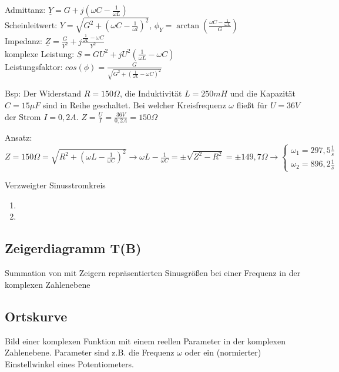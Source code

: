 \documentclass[german]{article}
\newcommand{\ohm}{\Omega}
\begin{document}
\begin{enumerate}
		Admittanz: $\underline{Y} = G + j\left( \omega C - \frac1{\omega L} \right)$ \\
		Scheinleitwert: $Y = \sqrt{G^2 + \left( \omega C - \frac1{\omega l} \right)^2}$, $\phi_Y = \arctan\left( \frac{\omega C - \frac1{\omega L}}{G} \right)$ \\
		Impedanz: $\underline{Z} = \frac{G}{Y^2} + j \frac{\frac1{\omega L} - \omega C}{Y^2}$ \\
		komplexe Leistung: $\underline{S} = GU^2 + j U^2 \left( \frac1{\omega L} - \omega C \right)$ \\
		Leistungsfaktor: $cos(\phi) = \frac{G}{\sqrt{G^2 + \left( \frac1{\omega L} - \omega C \right)^2}}$
\end{enumerate}

Bsp: Der Widerstand $R = 150\ohm$, die Induktivität $L = 250mH$ und die Kapazität $C = 15\mu F$ sind in Reihe geschaltet. Bei welcher Kreisfrequenz $\omega$ fließt für $U = 36V$ der Strom $I = 0,2A$. $Z = \frac{U}{I} = \frac{36V}{0,2A} = 150\ohm$

Ansatz: $Z = 150\ohm = \sqrt{R^2 + \left(\omega L - \frac1{\omega C} \right)^2} \rightarrow \omega L - \frac1{\omega C} = \pm \sqrt{Z^2 - R^2} = \pm 149,7 \ohm \rightarrow \left\{ \begin{array}{l}\omega_1 = 297,5 \frac1s \\ \omega_2 = 896,2 \frac1s \end{array} \right.$

Verzweigter Sinusstromkreis
\begin{enumerate}
	\item %
	\item %
\end{enumerate}

\subsection{Zeigerdiagramm T(B)}
Summation von mit Zeigern repräsentierten Sinusgrößen bei einer Frequenz in der komplexen Zahlenebene

\subsection{Ortskurve}
Bild einer komplexen Funktion mit einem reellen Parameter in der komplexen Zahlenebene. Parameter sind z.B. die Frequenz $\omega$ oder ein (normierter) Einstellwinkel eines Potentiometers.
\end{document}
